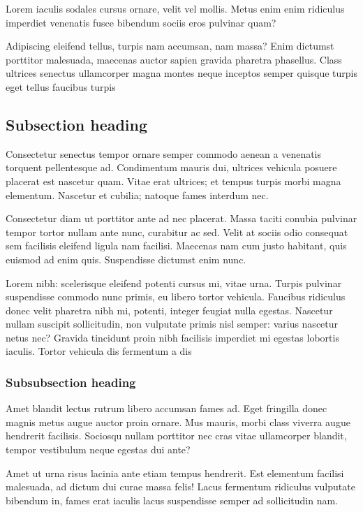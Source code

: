 \documentclass[
12pt,
a4paper,
twoside,
]{article}
\begin{document}
Lorem iaculis sodales cursus ornare, velit vel mollis. Metus enim enim
ridiculus imperdiet venenatis fusce bibendum sociis eros pulvinar quam?

Adipiscing eleifend tellus, turpis nam accumsan, nam massa? Enim
dictumst porttitor malesuada, maecenas auctor sapien gravida pharetra
phasellus. Class ultrices senectus ullamcorper magna montes neque
inceptos semper quisque turpis eget tellus faucibus turpis

\subsection{Subsection heading}\label{subsection-heading}

Consectetur senectus tempor ornare semper commodo aenean a venenatis
torquent pellentesque ad. Condimentum mauris dui, ultrices vehicula
posuere placerat est nascetur quam. Vitae erat ultrices; et tempus
turpis morbi magna elementum. Nascetur et cubilia; natoque fames
interdum nec.

Consectetur diam ut porttitor ante ad nec placerat. Massa taciti conubia
pulvinar tempor tortor nullam ante nunc, curabitur ac sed. Velit at
sociis odio consequat sem facilisis eleifend ligula nam facilisi.
Maecenas nam cum justo habitant, quis euismod ad enim quis. Suspendisse
dictumst enim nunc.

Lorem nibh: scelerisque eleifend potenti cursus mi, vitae urna. Turpis
pulvinar suspendisse commodo nunc primis, eu libero tortor vehicula.
Faucibus ridiculus donec velit pharetra nibh mi, potenti, integer
feugiat nulla egestas. Nascetur nullam suscipit sollicitudin, non
vulputate primis nisl semper: varius nascetur netus nec? Gravida
tincidunt proin nibh facilisis imperdiet mi egestas lobortis iaculis.
Tortor vehicula dis fermentum a dis

\subsubsection{Subsubsection heading}\label{subsubsection-heading}

Amet blandit lectus rutrum libero accumsan fames ad. Eget fringilla
donec magnis metus augue auctor proin ornare. Mus mauris, morbi class
viverra augue hendrerit facilisis. Sociosqu nullam porttitor nec cras
vitae ullamcorper blandit, tempor vestibulum neque egestas dui ante?

Amet ut urna risus lacinia ante etiam tempus hendrerit. Est elementum
facilisi malesuada, ad dictum dui curae massa felis! Lacus fermentum
ridiculus vulputate bibendum in, fames erat iaculis lacus suspendisse
semper ad sollicitudin nam.
\end{document}
